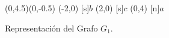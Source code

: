 \begin{figure}[h]
\begin{center}
\begin{graph}(0,4.5)(0,-0.5)
(-2,0)
[s]{$b$} 
(2,0)
[s]{$c$} 
(0,4)
[n]{$a$}
\end{graph}
\caption{Representación del Grafo $G_1$.}
\end{center}

\end{figure}




